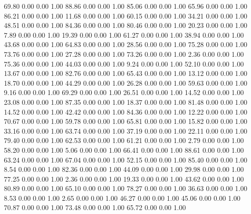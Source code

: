    69.80   0.00   0.00   1.00
   88.86   0.00   0.00   1.00
   85.06   0.00   0.00   1.00
   65.96   0.00   0.00   1.00
   86.21   0.00   0.00   1.00
   11.68   0.00   0.00   1.00
   60.15   0.00   0.00   1.00
   34.21   0.00   0.00   1.00
   48.51   0.00   0.00   1.00
   84.36   0.00   0.00   1.00
   80.46   0.00   0.00   1.00
   20.23   0.00   0.00   1.00
    7.89   0.00   0.00   1.00
   19.39   0.00   0.00   1.00
   61.27   0.00   0.00   1.00
   38.94   0.00   0.00   1.00
   43.68   0.00   0.00   1.00
   64.83   0.00   0.00   1.00
   28.56   0.00   0.00   1.00
   75.28   0.00   0.00   1.00
   73.76   0.00   0.00   1.00
   27.28   0.00   0.00   1.00
   73.26   0.00   0.00   1.00
    2.36   0.00   0.00   1.00
   75.36   0.00   0.00   1.00
   44.03   0.00   0.00   1.00
    9.24   0.00   0.00   1.00
   52.10   0.00   0.00   1.00
   13.67   0.00   0.00   1.00
   82.76   0.00   0.00   1.00
   65.43   0.00   0.00   1.00
   13.12   0.00   0.00   1.00
   18.70   0.00   0.00   1.00
   44.29   0.00   0.00   1.00
   26.28   0.00   0.00   1.00
   59.63   0.00   0.00   1.00
    9.16   0.00   0.00   1.00
   69.29   0.00   0.00   1.00
   26.51   0.00   0.00   1.00
   14.52   0.00   0.00   1.00
   23.08   0.00   0.00   1.00
   87.35   0.00   0.00   1.00
   18.37   0.00   0.00   1.00
   81.48   0.00   0.00   1.00
   14.52   0.00   0.00   1.00
   42.42   0.00   0.00   1.00
   84.36   0.00   0.00   1.00
   12.22   0.00   0.00   1.00
   70.67   0.00   0.00   1.00
   59.78   0.00   0.00   1.00
   65.81   0.00   0.00   1.00
   15.82   0.00   0.00   1.00
   33.16   0.00   0.00   1.00
   63.74   0.00   0.00   1.00
   37.19   0.00   0.00   1.00
   22.11   0.00   0.00   1.00
   79.40   0.00   0.00   1.00
   62.53   0.00   0.00   1.00
   61.21   0.00   0.00   1.00
    2.79   0.00   0.00   1.00
   58.20   0.00   0.00   1.00
    5.06   0.00   0.00   1.00
   66.41   0.00   0.00   1.00
   88.61   0.00   0.00   1.00
   63.24   0.00   0.00   1.00
   67.04   0.00   0.00   1.00
   52.15   0.00   0.00   1.00
   85.40   0.00   0.00   1.00
    8.54   0.00   0.00   1.00
   82.36   0.00   0.00   1.00
   44.09   0.00   0.00   1.00
   29.98   0.00   0.00   1.00
   77.25   0.00   0.00   1.00
    2.36   0.00   0.00   1.00
   19.33   0.00   0.00   1.00
   43.62   0.00   0.00   1.00
   80.89   0.00   0.00   1.00
   65.10   0.00   0.00   1.00
   78.27   0.00   0.00   1.00
   36.63   0.00   0.00   1.00
    8.53   0.00   0.00   1.00
    2.65   0.00   0.00   1.00
   46.27   0.00   0.00   1.00
   45.06   0.00   0.00   1.00
   70.87   0.00   0.00   1.00
   73.48   0.00   0.00   1.00
   65.72   0.00   0.00   1.00
